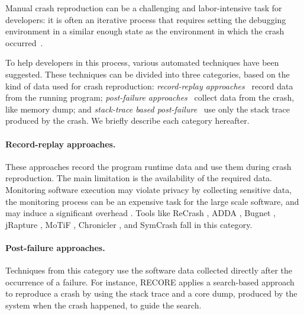Manual crash reproduction can be a challenging and labor-intensive task for developers: it is often an iterative process that requires setting the debugging environment in a similar enough state as the environment in which the crash occurred~\cite{Zeller2009}.

To help developers in this process, various automated techniques have been suggested.
These techniques can be divided into three categories, based on the kind of data used for crash reproduction: \emph{record-replay approaches}~\cite{Artzi2008, Clause2007, Narayanasamy2005, Steven2000, Gomez2016, Bell2013, Cao2014} record data from the running program; \emph{post-failure approaches}~\cite{Rossler2013, YZW17descry,Weeratunge2010, Leitner2007, Leitner2009, Kifetew2013, Kifetew2014} collect data from the crash, like memory dump; and \emph{stack-trace based post-failure}~\cite{BPT17concrash,soltani2017,Nayrolles2017,Xuan2015,Chen2015} use only the stack trace produced by the crash. We briefly describe each category hereafter.

\paragraph{Record-replay approaches.}

These approaches record the program runtime data and use them during crash reproduction. The main limitation is the availability of the required data. Monitoring software execution may violate privacy by collecting sensitive data, the monitoring process can be an expensive task for the large scale software, and may induce a significant overhead \cite{Chen2015, Nayrolles2017, Rossler2013}.
%
Tools like \textrm{ReCrash} \cite{Artzi2008}, \textrm{ADDA} \cite{Clause2007}, \textrm{Bugnet} \cite{Narayanasamy2005}, \textrm{jRapture} \cite{Steven2000}, \textrm{MoTiF} \cite{Gomez2016}, \textrm{Chronicler} \cite{Bell2013}, and \textrm{SymCrash} \cite{Cao2014} fall in this category.


\paragraph{Post-failure approaches.}

Techniques from this category use the software data collected directly after the occurrence of a failure. For instance, \textrm{RECORE} \cite{Rossler2013} applies a search-based approach to reproduce a crash by using the stack trace and a core dump, produced by the system when the crash happened, to guide the search.

